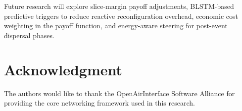 \documentclass[conference]{IEEEtran}
\begin{document}
Future research will explore slice-margin payoff adjustments, BLSTM-based
predictive triggers to reduce reactive reconfiguration
overhead, economic cost weighting in the payoff function,
and energy-aware steering for post-event dispersal phases.

\section*{Acknowledgment}
The authors would like to thank the OpenAirInterface Software
Alliance for providing the core networking framework used in
this research.



\end{document}
